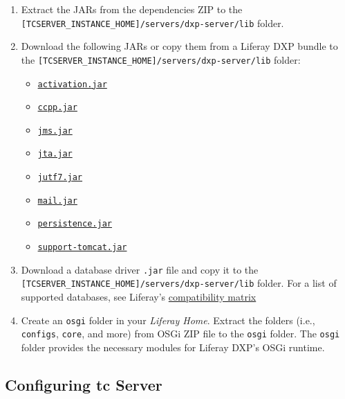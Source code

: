 \begin{enumerate}
\def\labelenumi{\arabic{enumi}.}
\item
  Extract the JARs from the dependencies ZIP to the
  \texttt{{[}TCSERVER\_INSTANCE\_HOME{]}/servers/dxp-server/lib} folder.
\item
  Download the following JARs or copy them from a Liferay DXP bundle to
  the \texttt{{[}TCSERVER\_INSTANCE\_HOME{]}/servers/dxp-server/lib}
  folder:

  \begin{itemize}
  \tightlist
  \item
    \href{http://www.oracle.com/technetwork/java/javase/jaf-136260.html}{\texttt{activation.jar}}
  \item
    \href{http://mvnrepository.com/artifact/javax.ccpp/ccpp/1.0}{\texttt{ccpp.jar}}
  \item
    \href{http://www.oracle.com/technetwork/java/docs-136352.html}{\texttt{jms.jar}}
  \item
    \href{http://www.oracle.com/technetwork/java/javaee/jta/index.html}{\texttt{jta.jar}}
  \item
    \href{http://mvnrepository.com/artifact/com.beetstra.jutf7/jutf7}{\texttt{jutf7.jar}}
  \item
    \href{http://www.oracle.com/technetwork/java/index-138643.html}{\texttt{mail.jar}}
  \item
    \href{http://mvnrepository.com/artifact/org.eclipse.persistence/javax.persistence/2.1.1}{\texttt{persistence.jar}}
  \item
    \href{http://mvnrepository.com/artifact/com.liferay.portal/com.liferay.support.tomcat}{\texttt{support-tomcat.jar}}
  \end{itemize}
\item
  Download a database driver \texttt{.jar} file and copy it to the
  \texttt{{[}TCSERVER\_INSTANCE\_HOME{]}/servers/dxp-server/lib} folder.
  For a list of supported databases, see Liferay's
  \href{https://web.liferay.com/documents/14/21598941/Liferay+DXP+7.1+Compatibility+Matrix/9f9c917a-c620-427b-865d-5c4b4a00be85}{compatibility
  matrix}
\item
  Create an \texttt{osgi} folder in your \emph{Liferay Home}. Extract
  the folders (i.e., \texttt{configs}, \texttt{core}, and more) from
  OSGi ZIP file to the \texttt{osgi} folder. The \texttt{osgi} folder
  provides the necessary modules for Liferay DXP's OSGi runtime.
\end{enumerate}

\subsection{Configuring tc Server}\label{configuring-tc-server}

